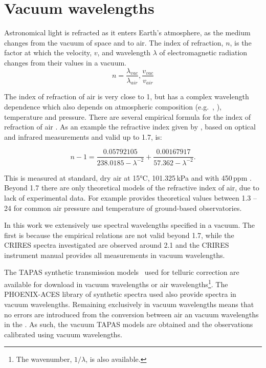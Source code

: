 
\chapter{Vacuum wavelengths}
Astronomical light is refracted as it enters Earth's atmosphere, as the medium changes from the vacuum of space and to air.
The index of refraction, \(n\), is the factor at which the velocity, \(v\), and wavelength \(\lambda\) of electromagnetic radiation changes from their values in a vacuum.
\begin{equation}
n  = \frac{\lambda_{vac}}{\lambda_{air}}, \frac{v_{vac}}{v_{air}}
\end{equation}

The index of refraction of air is very close to 1, but has a complex wavelength dependence which also depends on atmospheric composition (e.g.\ , ), temperature and pressure.
There are several empirical formula for the index of refraction of air \citep[e.g.][]{edlen_dispersion_1953, peck_dispersion_1972, ciddor_refractive_1996}.
As an example the refractive index given by \citet{ciddor_refractive_1996}, based on optical and infrared measurements and valid up to 1.7\um{}, is:

\begin{equation}
    n -1 = \frac{0.05792105}{238.0185 - \lambda^{-2}} + \frac{0.00167917}{57.362 - \lambda^{-2}}.
\end{equation}

This is measured at standard, dry air at 15\si{\degreeCelsius}, 101.325\,\si{\kilo\pascal} and with 450\,ppm .
Beyond 1.7\um{} there are only theoretical models of the refractive index of air, due to lack of experimental data.
For example \citet{mathar_refractive_2007} provides theoretical values between 1.3 -- 24\um{} for common air pressure and temperature of ground-based observatories.

In this work we extensively use spectral wavelengths specified in a vacuum.
The first is because the empirical relations are not valid beyond 1.7\um{}, while the {CRIRES} spectra investigated are observed around 2.1\um{} and the {CRIRES} instrument manual provides all measurements in vacuum wavelengths.

The {TAPAS} synthetic transmission models~\citet{bertaux_tapas_2014} used for telluric correction are available for download in vacuum wavelengths or air wavelengths\footnote{The wavenumber, \(1/\lambda\), is also available.}.
The {PHOENIX-ACES} library of synthetic spectra used also provide spectra in vacuum wavelengths.
Remaining exclusively in vacuum wavelengths means that no errors are introduced from the conversion between air an vacuum wavelengths in the \nir{}.
As such, the vacuum {TAPAS} models are obtained and the observations calibrated using vacuum wavelengths.
